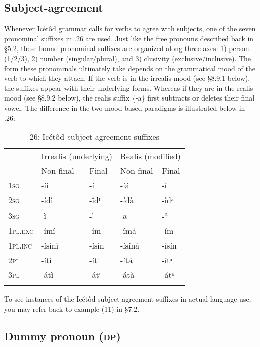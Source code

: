 \subsection{Subject-agreement}


Whenever Icétôd grammar calls for verbs to agree with subjects, one of the seven pronominal suffixes in .26 are used. Just like the free pronouns described back in §5.2, these bound pronominal suffixes are organized along three axes: 1) person (1/2/3), 2) number (singular/plural), and 3) clusivity (exclusive/inclusive). The form these pronominals ultimately take depends on the grammatical mood of the verb to which they attach. If the verb is in the irrealis mood (see §8.9.1 below), the suffixes appear with their underlying forms. Whereas if they are in the realis mood (see §8.9.2 below), the realis suffix \{-a\} first subtracts or deletes their final vowel. The difference in the two mood-based paradigms is illustrated below in .26:


\begin{table}
\caption{26: Icétôd subject-agreement suffixes}
\label{tab:8}


\begin{tabularx}{\textwidth}{XXXXX} & \multicolumn{2}{X}{Irrealis (underlying)} & \multicolumn{2}{X}{Realis (modified)}\\
\lsptoprule
& Non-final & Final & Non-final & Final\\
\textsc{1sg} & {}-íí & {}-í & {}-íá & {}-í\\
\textsc{2sg} & {}-ídì & {}-îdⁱ & {}-ídà & {}-îdᵃ\\
\textsc{3sg} & {}-ì & {}-\textsuperscript{i} & {}-a & {}-\textsuperscript{a}\\
\textsc{1pl.exc} & {}-ímí & {}-ím & {}-ímá & {}-ím\\
\textsc{1pl.inc} & {}-ísínì & {}-ísín & {}-ísínà & {}-ísín\\
\textsc{2pl} & {}-ítí & {}-ítⁱ & {}-ítá & {}-ítᵃ\\
\textsc{3pl} & {}-átì & {}-átⁱ & {}-átà & {}-átᵃ\\
\lspbottomrule
\end{tabularx}
\end{table}

To see instances of the Icétôd subject-agreement suffixes in actual language use, you may refer back to example (11) in §7.2.




\subsection{Dummy pronoun (\textsc{dp})}


